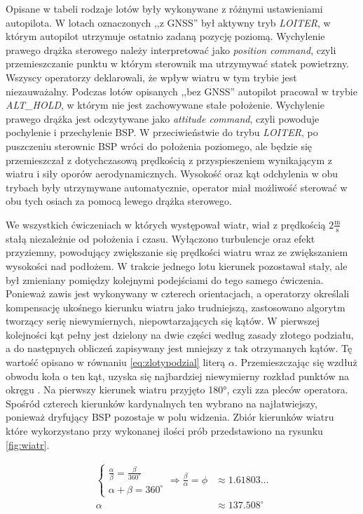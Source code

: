 Opisane w tabeli rodzaje lotów były wykonywane z różnymi ustawieniami autopilota. W lotach oznaczonych ,,z GNSS'' był aktywny tryb \emph{LOITER}, w którym autopilot utrzymuje ostatnio zadaną pozycję poziomą. Wychylenie prawego drążka sterowego należy interpretować jako \emph{position command}, czyli przemieszczanie punktu w którym sterownik ma utrzymywać statek powietrzny. Wszyscy operatorzy deklarowali, że wpływ wiatru w tym trybie jest niezauważalny. Podczas lotów opisanych ,,bez GNSS'' autopilot pracował w trybie \emph{ALT\_HOLD}, w którym nie jest zachowywane stałe położenie. Wychylenie prawego drążka jest odczytywane jako \emph{attitude command}, czyli powoduje pochylenie i przechylenie BSP. W przeciwieństwie do trybu \emph{LOITER}, po puszczeniu sterownic BSP wróci do położenia poziomego, ale będzie się przemieszczał z dotychczasową prędkością z przyspieszeniem wynikającym z wiatru i siły oporów aerodynamicznych. Wysokość oraz kąt odchylenia w obu trybach były utrzymywane automatycznie, operator miał możliwość sterować w obu tych osiach za pomocą lewego drążka sterowego.

We wszystkich ćwiczeniach w których występował wiatr, wiał z prędkością $ 2 \frac{\text{m}}{\text{s}} $ stałą niezależnie od położenia i czasu. Wyłączono turbulencje oraz efekt przyziemny, powodujący zwiększanie się prędkości wiatru wraz ze zwiększaniem wysokości nad podłożem. W trakcie jednego lotu kierunek pozostawał stały, ale był zmieniany pomiędzy kolejnymi podejściami do tego samego ćwiczenia. Ponieważ zawis jest wykonywany w czterech orientacjach, a operatorzy określali kompensację ukośnego kierunku wiatru jako trudniejszą, zastosowano algorytm tworzący serię niewymiernych, niepowtarzających się kątów. W pierwszej kolejności kąt pełny jest dzielony na dwie części według zasady złotego podziału, a do następnych obliczeń zapisywany jest mniejszy z tak otrzymanych kątów. Tę wartość opisano w równaniu \ref{eq:zlotypodzial} literą $ \alpha $. Przemieszczając się wzdłuż obwodu koła o ten kąt, uzyska się najbardziej niewymierny rozkład punktów na okręgu \cite{ridley1982}. Na pierwszy kierunek wiatru przyjęto 180°, czyli zza pleców operatora. Spośród czterech kierunków kardynalnych ten wybrano na najłatwiejszy, ponieważ dryfujący BSP pozostaje w polu widzenia. Zbiór kierunków wiatru które wykorzystano przy wykonanej ilości prób przedstawiono na rysunku \ref{fig:wiatr}.

\begin{align}
    \label{eq:zlotypodzial}
    \begin{cases}
        \frac{\alpha}{\beta} = \frac{\beta}{360^{\circ}} \\
        \alpha + \beta = 360^{\circ}
    \end{cases} \Rightarrow \frac{\beta}{\alpha} = \phi &\approx 1.61803\dots
    \\
    \alpha &\approx 137.508^{\circ}
\end{align}

